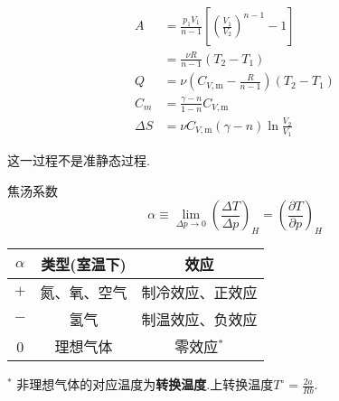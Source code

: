 \documentclass[10pt]{article}
\numberwithin{equation}{section}
\begin{document}
\begin{multicols}{3}
\begin{CJK}{UTF8}{song}
\begin{align}
  A&=\frac{p_1V_{1}}{n -1}\left[\left(\frac{V_{1}}{V_{2}}\right)^{n -1}-1\right]\nonumber\\ &=\frac{\nu R}{n-1}(T_2-T_1) \\
  Q&=\nu \left( C_{V,\textrm{m}}-\frac{R}{n-1} \right) (T_2-T_1)\\
  C_m&=\frac{\gamma -n}{1-n}C_{V,\textrm{m}} \\
  \Delta S&=\nu C_{V,\textrm{m}} (\gamma -n)\ln \frac{V_{2}}{V_{1}}
\end{align}
\begin{center}
\end{center}
这一过程不是准静态过程.
\begin{center}
\end{center}

焦汤系数
\begin{equation}
  \alpha \equiv \lim_{\Delta p \rightarrow 0} \left( \frac{\Delta T}{\Delta p} \right)_H = \left(\frac{\partial T}{\partial p} \right)_H
\end{equation}




\begin{center}
\begin{tabular}{ccc}
  \hline
  $\alpha$ & 类型(室温下)  & 效应\\
  \hline
  $+$ & 氮、氧、空气 & 制冷效应、正效应\\
  $-$ & 氢气 & 制温效应、负效应 \\
  0 & 理想气体 & 零效应$^{*}$ \\
  \hline

\end{tabular}
\begin{flushleft}
\small $^{*}$ 非理想气体的对应温度为\textbf{转换温度}.上转换温度$T^{\circ}=\frac{2a}{Rb}$.
\end{flushleft}
\end{center}




\end{CJK}
\end{multicols}
\end{document}
